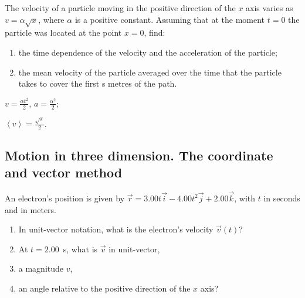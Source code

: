 \begin{problem}
	The velocity of a particle moving in the positive direction 
	of the $x$ axis varies as $v = \alpha\sqrt{x}$, where $\alpha$ is a positive constant. 
	Assuming that at the moment $t = 0$ the particle was located at the point $x = 0$, find: 
	\begin{enumerate}[label = (\alph*)]
		\item the time dependence of the velocity and the acceleration of the particle;
		\item the mean velocity of the particle averaged over the time that 
		the particle takes to cover the first s metres of the path.
	\end{enumerate}
	\begin{solution}
		\begin{enumerate*}[label = (\alph*)]
			\item $v = \frac{\alpha t^2}{2}$, $a = \frac{\alpha^2}{2}$;
			\item $\left\langle v \right\rangle = \frac{\sqrt{s}}{2}$.
		\end{enumerate*}
	\end{solution}
\end{problem}


\subsection{Motion in three dimension. The coordinate and vector method}

\begin{problem}
	An electron's position is given by $\vec r = 3.00t \vec i -4.00 t^2\vec j + 2.00 \vec k$,
	with $t$ in seconds and in meters. 
	\begin{enumerate}[label = (\alph*)]
		\item In unit-vector notation, what is the electron’s velocity $\vec v(t)$? 
		\item At $t = 2.00$~s, what is $\vec v$ in unit-vector,
		\item a magnitude $v$,
		\item an angle relative to 	the positive direction of the $x$ axis?
	\end{enumerate}
\end{problem}


